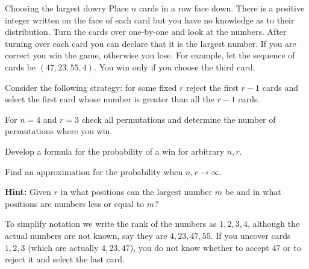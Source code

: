 
\begin{prob}{Choosing the largest dowry}
Place $n$ cards in a row face down. There is a positive integer written on the face of each card but you have no knowledge as to their distribution. Turn the cards over one-by-one and look at the numbers. After turning over each card you can declare that it is the largest number. If you are correct you win the game, otherwise you lose. For example, let the sequence of cards be $(47, 23, 55, 4)$. You win only if you choose the third card.

Consider the following strategy: for some fixed $r$ reject the first $r-1$ cards and select the first card whose number is greater than all the $r-1$ cards.

 For $n=4$ and $r=3$ check all permutations and determine the number of permutations where you win.

 Develop a formula for the probability of a win for arbitrary $n, r$.

 Find an approximation for the probability when $n,r\rightarrow \infty$.

\textbf{Hint:} Given $r$ in what positions can the largest number $m$ be and in what positions are numbers less or equal to $m$? 

\end{prob}

\solution{}

To simplify notation we write the rank of the numbers as $1,2,3,4$, although the actual numbers are not known, say they are $4,23,47,55$. If you uncover cards $1,2,3$ (which are actually $4,23,47$), you do not know whether to accept $47$ or to reject it and select the last card.

